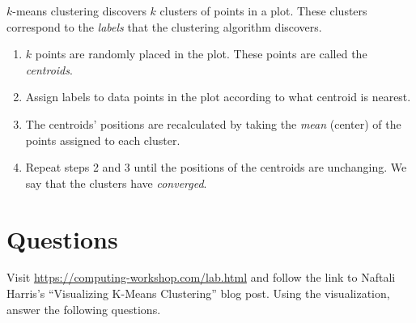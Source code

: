 \documentclass[11pt]{article}
\title{\vspace{-3em}\kmc}
\author{Computing Workshop: Machine Learning}
\date{}
\newcommand{\kmc}{$k$-means clustering}
\begin{document}
\maketitle

\kmc{} discovers $k$ clusters of points in a plot. These clusters correspond to
the \emph{labels} that the clustering algorithm discovers.
\begin{enumerate}
\item
  $k$ points are randomly placed in the plot. These points are called the
  \emph{centroids}.
\item
  Assign labels to data points in the plot according to what centroid is nearest.
\item
  The centroids' positions are recalculated by taking the \emph{mean} (center)
  of the points assigned to each cluster.
\item
  Repeat steps 2 and 3 until the positions of the centroids are unchanging.
  We say that the clusters have \emph{converged}.
\end{enumerate}

\section*{Questions}

Visit \url{https://computing-workshop.com/lab.html} and follow the link to
Naftali Harris's ``Visualizing K-Means Clustering'' blog post.
Using the visualization, answer the following questions.
\end{document}
